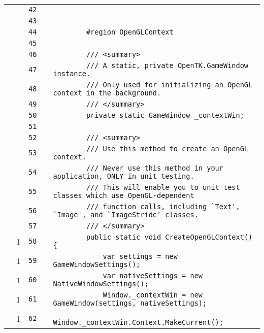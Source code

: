 \documentclass[a4paper,landscape,10pt]{article}
\begin{document}
\begin{longtable}[l]{lrrll}
\cellcolor{gray} &  & \verb~42~ & & \verb~~\\
\cellcolor{gray} &  & \verb~43~ & & \verb~~\\
\cellcolor{gray} &  & \verb~44~ & & \verb~        #region OpenGLContext~\\
\cellcolor{gray} &  & \verb~45~ & & \verb~~\\
\cellcolor{gray} &  & \verb~46~ & & \verb~        /// <summary>~\\
\cellcolor{gray} &  & \verb~47~ & & \verb~        /// A static, private OpenTK.GameWindow instance.~\\
\cellcolor{gray} &  & \verb~48~ & & \verb~        /// Only used for initializing an OpenGL context in the background.~\\
\cellcolor{gray} &  & \verb~49~ & & \verb~        /// </summary>~\\
\cellcolor{gray} &  & \verb~50~ & & \verb~        private static GameWindow _contextWin;~\\
\cellcolor{gray} &  & \verb~51~ & & \verb~~\\
\cellcolor{gray} &  & \verb~52~ & & \verb~        /// <summary>~\\
\cellcolor{gray} &  & \verb~53~ & & \verb~        /// Use this method to create an OpenGL context.~\\
\cellcolor{gray} &  & \verb~54~ & & \verb~        /// Never use this method in your application, ONLY in unit testing.~\\
\cellcolor{gray} &  & \verb~55~ & & \verb~        /// This will enable you to unit test classes which use OpenGL-dependent~\\
\cellcolor{gray} &  & \verb~56~ & & \verb~        /// function calls, including `Text', `Image', and `ImageStride' classes.~\\
\cellcolor{gray} &  & \verb~57~ & & \verb~        /// </summary>~\\
\cellcolor{green} & 1 & \verb~58~ & & \verb~        public static void CreateOpenGLContext() {~\\
\cellcolor{green} & 1 & \verb~59~ & & \verb~            var settings = new GameWindowSettings();~\\
\cellcolor{green} & 1 & \verb~60~ & & \verb~            var nativeSettings = new NativeWindowSettings();~\\
\cellcolor{green} & 1 & \verb~61~ & & \verb~            Window._contextWin = new GameWindow(settings, nativeSettings);~\\
\cellcolor{green} & 1 & \verb~62~ & & \verb~            Window._contextWin.Context.MakeCurrent();~\\

\end{longtable}
\end{document}
